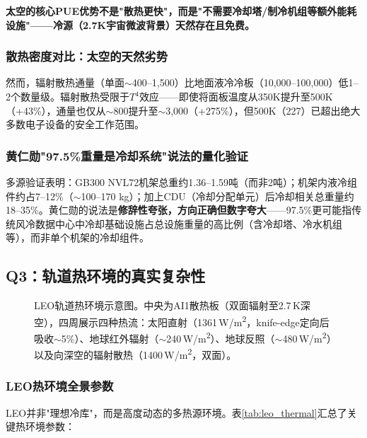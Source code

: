\textbf{太空的核心PUE优势不是"散热更快"，而是"不需要冷却塔/制冷机组等额外能耗设施"——冷源（2.7K宇宙微波背景）天然存在且免费。}\cite{uptime2024,google2024pue,microsoft2024pue}

\subsubsection{散热密度对比：太空的天然劣势}

然而，辐射散热通量（单面$\sim$400--1,500\unitWpm{}）比地面液冷冷板（10,000--100,000\unitWpm{}）低1--2个数量级。辐射散热受限于$T^{4}$效应——即使将面板温度从350K提升至500K（+43\%），通量也仅从$\sim$800提升至$\sim$3,000\unitWpm{}（+275\%），但500K（227\unitC{}）已超出绝大多数电子设备的安全工作范围。

\subsubsection{黄仁勋"97.5\%重量是冷却系统"说法的量化验证}

多源验证表明：GB300 NVL72机架总重约1.36--1.59吨（而非2吨）；机架内液冷组件约占7--12\%（$\sim$100--170 kg）；加上CDU（冷却分配单元）后冷却相关总重量约18--35\%\cite{lenovo2025gb300,aivres2025krs}。黄仁勋的说法是\textbf{修辞性夸张，方向正确但数字夸大}——97.5\%更可能指传统风冷数据中心中冷却基础设施占总设施重量的高比例（含冷却塔、冷水机组等），而非单个机架的冷却组件。

\subsection{Q3：轨道热环境的真实复杂性}

\begin{figure}[H]
\centering

\caption{LEO轨道热环境示意图。中央为AI1散热板（双面辐射至2.7\,K深空），四周展示四种热流：太阳直射（1361\,W/m\textsuperscript{2}，knife-edge定向后吸收$\sim$5\%）、地球红外辐射（$\sim$240\,W/m\textsuperscript{2}）、地球反照（$\sim$480\,W/m\textsuperscript{2}）以及向深空的辐射散热（1400\,W/m\textsuperscript{2}，双面）。}
\label{fig:leo_thermal_env}
\end{figure}

\subsubsection{LEO热环境全景参数}

LEO并非"理想冷库"，而是高度动态的多热源环境。表\ref{tab:leo_thermal}汇总了关键热环境参数\cite{clawson2002thermal,nasa2021tm4527}：

